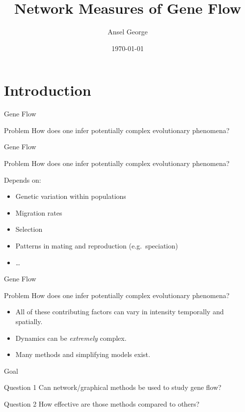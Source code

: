 \documentclass{beamer}
\title{Network Measures of Gene Flow}
\author{Ansel George}
\date{\today}
\begin{document}
\begin{frame}
\titlepage%
\end{frame}

\section{Introduction}

\begin{frame}{Gene Flow}
  \begin{block}{Problem}
    How does one infer potentially complex evolutionary phenomena?
  \end{block}
\end{frame}

\begin{frame}{Gene Flow}
  \begin{block}{Problem}
    How does one infer potentially complex evolutionary phenomena?
  \end{block}
  Depends on:
  \begin{itemize}
    \item Genetic variation within populations
    \item Migration rates
    \item Selection
    \item Patterns in mating and reproduction (e.g.\ speciation)
    \item \dots
  \end{itemize}
\end{frame}

\begin{frame}{Gene Flow}
  \begin{block}{Problem}
    How does one infer potentially complex evolutionary phenomena?
  \end{block}
  \begin{itemize}
    \item All of these contributing factors can vary in intensity temporally
      and spatially.
    \item Dynamics can be \textit{extremely} complex.
    \item Many methods and simplifying models exist.
  \end{itemize}
\end{frame}

\begin{frame}{Goal}
  \begin{block}{Question 1}
    Can network/graphical methods be used to study gene flow?
  \end{block}

  \vspace{2em}

  \begin{block}{Question 2}
    How effective are those methods compared to others?
  \end{block}
\end{frame}
\end{document}
